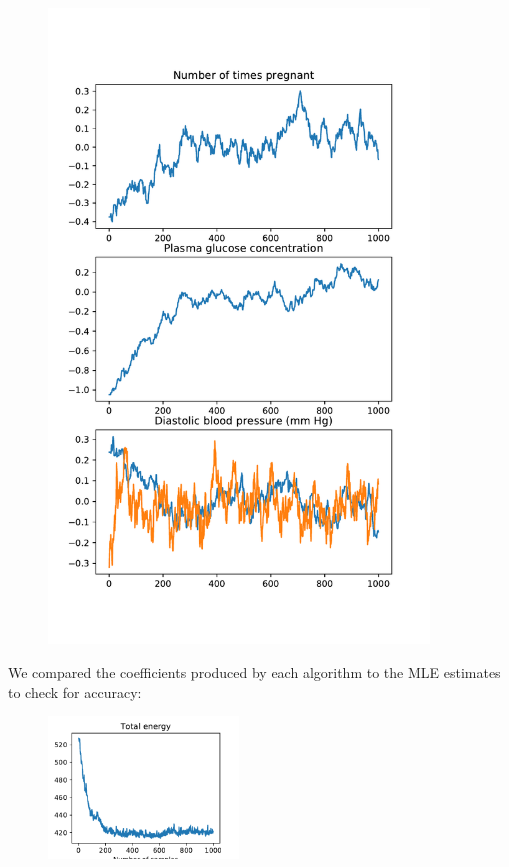 \begin{figure}[H]
\begin{minipage}{0.45\textwidth}
		\includegraphics[width=0.9\textwidth]{sghmc-trace-pima.pdf} %
	\end{minipage}
\end{figure}


We compared the coefficients produced by each algorithm to the MLE estimates to check for accuracy:

\begin{figure}[H]
	\centering
	\includegraphics[width=0.45\textwidth]{hmc-energy-pima.pdf}
\end{figure}

